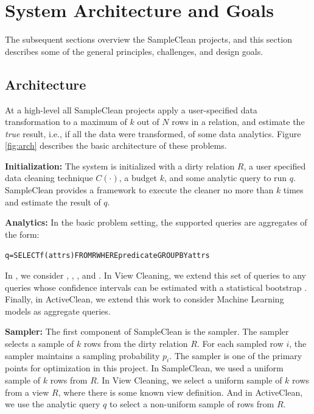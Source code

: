 \section{System Architecture and Goals}
The subsequent sections overview the SampleClean projects, and this section describes some of the general principles, challenges, and design goals. 

\subsection{Architecture}
At a high-level all SampleClean projects apply a user-specified data transformation to a maximum of $k$ out of $N$ rows in a relation, and estimate the \emph{true} result, i.e., if all the data were transformed, of some data analytics. Figure \ref{fig:arch} describes the basic architecture of these problems. 

\vspace{0.5em}
\noindent\textbf{Initialization: } The system is initialized with a dirty relation $R$, a user specified data cleaning technique $C(\cdot)$, a budget $k$, and some analytic query to run $q$. SampleClean provides a framework to execute the cleaner no more than $k$ times and estimate the result of $q$.  

\vspace{0.5em}
\noindent\textbf{Analytics: } In the basic problem setting, the supported queries are aggregates of the form:
\begin{alltt}
q = SELECT \textsf{f}(attrs) FROM R WHERE predicate GROUP BY attrs
\end{alltt}
In \sampleclean, we consider \avgfunc, \sumfunc, \countfunc, and \varfunc.
In View Cleaning, we extend this set of queries to any queries whose confidence intervals can be estimated with a statistical bootstrap \cite{agarwalknowing}. 
Finally, in ActiveClean, we extend this work to consider Machine Learning models as aggregate queries.

\vspace{0.5em}
\noindent\textbf{Sampler: } The first component of SampleClean is the sampler. The sampler selects a sample of $k$ rows from the dirty relation $R$. For each sampled row $i$, the sampler maintains a sampling probability $p_i$. The sampler is one of the primary points for optimization in this project. In SampleClean, we used a uniform sample of $k$ rows from $R$.
In View Cleaning, we select a uniform sample of $k$ rows from a view $R$, where there is some known view definition.
And in ActiveClean, we use the analytic query $q$ to select a non-uniform sample of rows from $R$.

